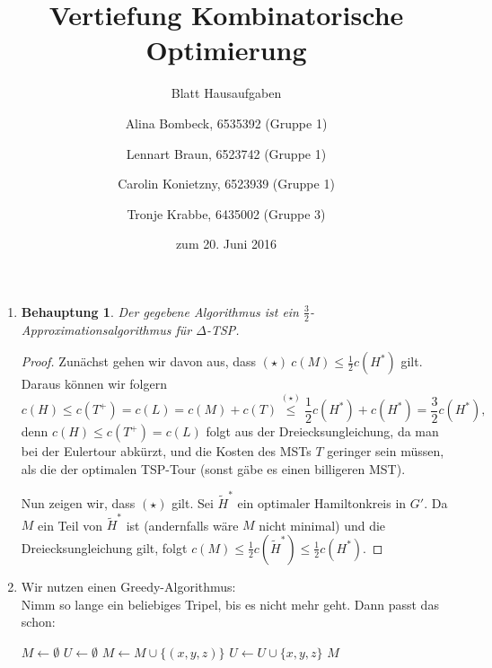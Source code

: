 \documentclass[a4paper]{scrartcl}
\title{Vertiefung Kombinatorische Optimierung}
\subtitle{Blatt {\blattnr} Hausaufgaben}
\author{%
    Alina Bombeck, 6535392 (Gruppe 1) \and
    Lennart Braun, 6523742 (Gruppe 1) \and
    Carolin Konietzny, 6523939 (Gruppe 1) \and
    Tronje Krabbe, 6435002 (Gruppe 3)
}
\date{zum 20. Juni 2016}
\newcommand{\approxalg}[1]{$#1$-Ap\-pro\-xi\-ma\-ti\-ons\-al\-go\-rith\-mus}
\newtheorem*{proposition}{Behauptung}
\begin{document}
\maketitle


\begin{enumerate}[label=\bfseries \arabic*.]
\item %
    \begin{proposition}
        Der gegebene Algorithmus ist ein \approxalg{\frac{3}{2}} für $\Delta$-TSP.
    \end{proposition}
    \begin{proof}
        Zunächst gehen wir davon aus, dass $(\star)\ c(M) \leq \frac{1}{2} c(H^*)$ gilt.
        Daraus können wir folgern
        \begin{equation*}
            c(H)
            \leq c(T^+) = c(L) = c(M) + c(T)
            \stackrel{(\star)}{\leq} \frac{1}{2} c(H^*) + c(H^*) = \frac{3}{2} c(H^*),
        \end{equation*}
        denn $c(H) \leq c(T^+) = c(L)$ folgt aus der Dreiecksungleichung, da man
        bei der Eulertour abkürzt, und die Kosten des MSTs $T$ geringer sein
        müssen, als die der optimalen TSP-Tour (sonst gäbe es einen billigeren
        MST).

        Nun zeigen wir, dass $(\star)$ gilt.
        Sei $\tilde{H}^\ast$ ein optimaler Hamiltonkreis in $G'$. Da $M$ ein
        Teil von $\tilde{H}^\ast$ ist (andernfalls wäre $M$ nicht minimal) und
        die Dreiecksungleichung gilt, folgt
        $c(M) \leq  \frac{1}{2}c(\tilde{H}^\ast) \leq \frac{1}{2}c(H^\ast)$.
    \end{proof}

\item %
    Wir nutzen einen Greedy-Algorithmus:\\
    Nimm so lange ein beliebiges Tripel, bis es nicht mehr geht.
    Dann passt das schon:
    \begin{algorithm}[H]
        \begin{algorithmic}[1]
            \State $M \gets \emptyset$
            \State $U \gets \emptyset$
                \State $M \gets M \cup \{(x,y,z)\}$
                \State $U \gets U \cup \{x,y,z\}$
            \EndIf
            \EndFor
            \State \Return $M$
            \EndProcedure
        \end{algorithmic}
    \end{algorithm}


\end{enumerate}
\end{document}
